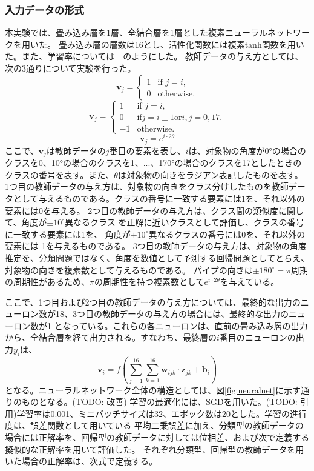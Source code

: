 \documentclass[11pt,a4paper,uplatex,draft]{ujarticle}
\begin{document}
  
  \subsubsection{入力データの形式}
  本実験では、畳み込み層を1層、全結合層を1層とした複素ニューラルネットワークを用いた。
  畳み込み層の層数は16とし、活性化関数には複素tanh関数を用いた。また、学習率については　のようにした。
  教師データの与え方としては、次の3通りについて実験を行った。
  \[
    \mathbf{v}_j =
    \begin{cases}
        1 & \text{if } j = i, \\
        0 & \text{otherwise}.
    \end{cases}
  \]
  \[
    \mathbf{v}_j =
    \begin{cases}
        1 & \text{if } j = i, \\
        0 & \text{if} j = i \pm 1 \text{or} {i, j} = {0, 17}.\\
        -1 & \text{otherwise}.
    \end{cases}
  \]
  \[
    \mathbf{v}_j = e^{i\cdot2\theta}
  \]
  ここで、$\mathbf{v}_j$は教師データの$j$番目の要素を表し、$i$は、対象物の角度が0°の場合のクラスを0、10°の場合のクラスを1、...、170°の場合のクラスを17としたときの
  クラスの番号を表す。また、$\theta$は対象物の向きをラジアン表記したものを表す。
  1つ目の教師データの与え方は、対象物の向きをクラス分けしたものを教師データとして与えるものである。クラスの番号に一致する要素には1を、それ以外の要素には0を与える。
  2つ目の教師データの与え方は、クラス間の類似度に関して、角度が$\pm10^{\circ}$異なるクラス
  を正解に近いクラスとして評価し、クラスの番号に一致する要素には1を、 角度が$\pm10^{\circ}$異なるクラスの番号には0を、それ以外の要素には-1を与えるものである。
  3つ目の教師データの与え方は、対象物の角度推定を、分類問題ではなく、角度を数値として予測する回帰問題としてとらえ、対象物の向きを複素数として与えるものである。
  パイプの向きは$\pm180^{\circ} = \pi$周期の周期性があるため、$\pi$の周期性を持つ複素数として$e^{i\cdot2\theta}$を与えている。

  ここで、1つ目および2つ目の教師データの与え方については、最終的な出力のニューロン数が18、3つ目の教師データの与え方の場合には、最終的な出力のニューロン数が1
  となっている。これらの各ニューロンは、直前の畳み込み層の出力から、全結合層を経て出力される。すなわち、最終層の$i$番目のニューロンの出力$y_i$は、
  \[
    \mathbf{v}_i = f(\sum_{j=1}^{16} \sum_{k=1}^{16} \mathbf{w}_{ijk} \cdot \mathbf{z}_{jk} + \mathbf{b}_i)
  \]
  となる。ニューラルネットワーク全体の構造としては、図\ref{fig:neuralnet}に示す通りのものとなる。(TODO: 改善)
  学習の最適化には、SGDを用いた。(TODO: 引用)学習率は0.001、ミニバッチサイズは32、エポック数は20とした。学習の進行度は、誤差関数として用いている
  平均二乗誤差に加え、分類型の教師データの場合には正解率を、回帰型の教師データに対しては位相差、および次で定義する擬似的な正解率を用いて評価した。
  それぞれ分類型、回帰型の教師データを用いた場合の正解率は、次式で定義する。
\end{document}
